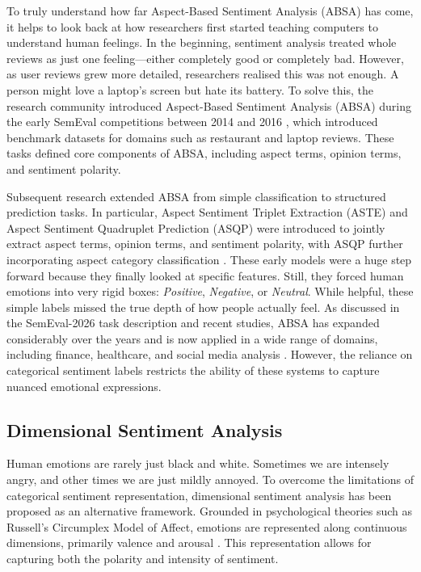 \documentclass{article}
\begin{document}
To truly understand how far Aspect-Based Sentiment Analysis (ABSA) has come, it helps to look back at how researchers first started teaching computers to understand human feelings. In the beginning, sentiment analysis treated whole reviews as just one feeling—either completely good or completely bad. However, as user reviews grew more detailed, researchers realised this was not enough. A person might love a laptop's screen but hate its battery. To solve this, the research community introduced Aspect-Based Sentiment Analysis (ABSA) during the early SemEval competitions between 2014 and 2016 \cite{pontiki2014semeval, pontiki2015semeval, pontiki2016semeval}, which introduced benchmark datasets for domains such as restaurant and laptop reviews. These tasks defined core components of ABSA, including aspect terms, opinion terms, and sentiment polarity.

Subsequent research extended ABSA from simple classification to structured prediction tasks. In particular, Aspect Sentiment Triplet Extraction (ASTE) and Aspect Sentiment Quadruplet Prediction (ASQP) were introduced to jointly extract aspect terms, opinion terms, and sentiment polarity, with ASQP further incorporating aspect category classification \cite{peng2020aste, xu2020position, cai2021asqp}.
These early models were a huge step forward because they finally looked at specific features. Still, they forced human emotions into very rigid boxes: \textit{Positive}, \textit{Negative}, or \textit{Neutral}. While helpful, these simple labels missed the true depth of how people actually feel. As discussed in the SemEval-2026 task description and recent studies, ABSA has expanded considerably over the years and is now applied in a wide range of domains, including finance, healthcare, and social media analysis \cite{yu2026dimabsa, chebolu2023review, hua2024systematic, daniello2022knowmis}. However, the reliance on categorical sentiment labels restricts the ability of these systems to capture nuanced emotional expressions.

\subsection{Dimensional Sentiment Analysis}

Human emotions are rarely just black and white. Sometimes we are intensely angry, and other times we are just mildly annoyed. To overcome the limitations of categorical sentiment representation, dimensional sentiment analysis has been proposed as an alternative framework. Grounded in psychological theories such as Russell’s Circumplex Model of Affect, emotions are represented along continuous dimensions, primarily valence and arousal \cite{russell1980circumplex}. This representation allows for capturing both the polarity and intensity of sentiment.
\end{document}

